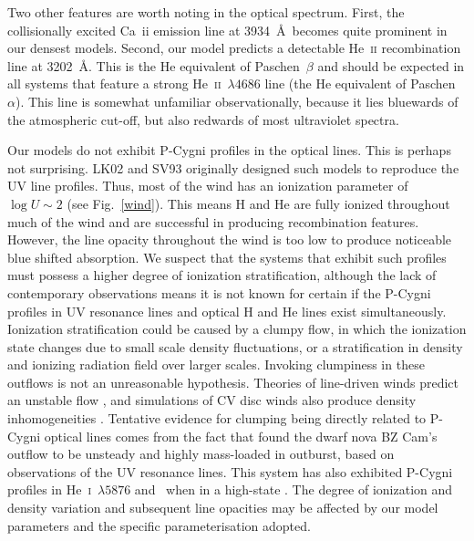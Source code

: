 Two other features are worth noting in the optical
spectrum. First, the collisionally excited Ca~{\sc ii} emission line at 3934~\AA\ 
becomes quite prominent in our densest models. Second, our model predicts a detectable
He~\textsc{ii} recombination line at 3202~\AA. This is the He
equivalent of Paschen~$\beta$ and should be expected in all systems that
feature a strong He~\textsc{ii}~$\lambda4686$ line (the He
equivalent of Paschen~$\alpha$). 
This line is somewhat unfamiliar observationally, because it 
lies bluewards of the atmospheric cut-off, but
also redwards of most ultraviolet spectra. 

Our models do not exhibit P-Cygni profiles in the optical lines.
This is perhaps not surprising. LK02 and SV93 originally designed such models
to reproduce the UV line profiles. Thus, most of the wind
has an ionization parameter of $\log U \sim 2$ (see Fig.~\ref{wind}).
This means H and He are fully ionized throughout 
much of the wind and are successful in producing recombination features.
However, the line opacity throughout the wind is too
low to produce noticeable blue shifted absorption. 
We suspect that the systems that exhibit such profiles must 
possess a higher degree of ionization stratification, although the lack 
of contemporary observations means it is not known for certain if the 
P-Cygni profiles in UV resonance lines and optical H and He lines exist simultaneously.
Ionization stratification could be caused by a clumpy flow, in which the ionization state 
changes due to small scale density fluctuations, or a stratification in density
and ionizing radiation field over larger scales.
Invoking clumpiness in these outflows is not an unreasonable
hypothesis. Theories of line-driven winds predict an unstable flow
\citep{macgregor1979,owockirybicki1984,owockirybicki1985}, and
simulations of CV disc winds also produce density inhomogeneities 
\citep{proga1998,pkdh2002}.
Tentative evidence for clumping being directly related to P-Cygni optical lines
comes from the fact that \cite{prinja2000}
found the dwarf nova BZ Cam's outflow to be unsteady and highly mass-loaded in outburst,
based on observations of the UV resonance lines.
This system has also exhibited P-Cygni profiles in He~\textsc{i}~$\lambda5876$
and \ha\ when in a high-state \citep{patterson1996,RN98}. 
The degree of ionization and density variation and 
subsequent line opacities may be affected by our model parameters
and the specific parameterisation adopted.

